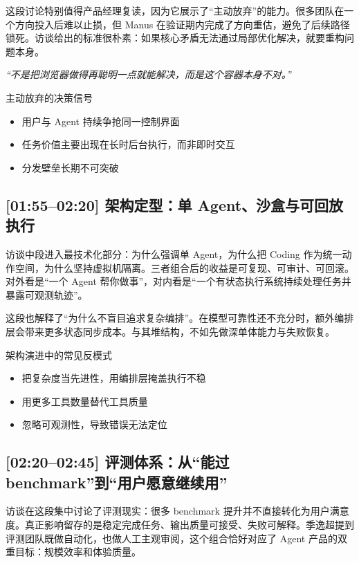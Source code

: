 \documentclass[a4paper]{article}
\begin{document}
这段讨论特别值得产品经理复读，因为它展示了“主动放弃”的能力。很多团队在一个方向投入后难以止损，但 Manus 在验证期内完成了方向重估，避免了后续路径锁死。访谈给出的标准很朴素：如果核心矛盾无法通过局部优化解决，就要重构问题本身。

\textit{``不是把浏览器做得再聪明一点就能解决，而是这个容器本身不对。''}

\begin{knowledgebox}{主动放弃的决策信号}
\begin{itemize}
    \item 用户与 Agent 持续争抢同一控制界面
    \item 任务价值主要出现在长时后台执行，而非即时交互
    \item 分发壁垒长期不可突破
\end{itemize}
\end{knowledgebox}

\subsection{[01:55--02:20] 架构定型：单 Agent、沙盒与可回放执行}

访谈中段进入最技术化部分：为什么强调单 Agent，为什么把 Coding 作为统一动作空间，为什么坚持虚拟机隔离。三者组合后的收益是可复现、可审计、可回滚。对外看是“一个 Agent 帮你做事”，对内看是“一个有状态执行系统持续处理任务并暴露可观测轨迹”。

这段也解释了“为什么不盲目追求复杂编排”。在模型可靠性还不充分时，额外编排层会带来更多状态同步成本。与其堆结构，不如先做深单体能力与失败恢复。

\begin{warningbox}{架构演进中的常见反模式}
\begin{itemize}
    \item 把复杂度当先进性，用编排层掩盖执行不稳
    \item 用更多工具数量替代工具质量
    \item 忽略可观测性，导致错误无法定位
\end{itemize}
\end{warningbox}

\subsection{[02:20--02:45] 评测体系：从“能过 benchmark”到“用户愿意继续用”}

访谈在这段集中讨论了评测现实：很多 benchmark 提升并不直接转化为用户满意度。真正影响留存的是稳定完成任务、输出质量可接受、失败可解释。季逸超提到评测团队既做自动化，也做人工主观审阅，这个组合恰好对应了 Agent 产品的双重目标：规模效率和体验质量。
\end{document}
